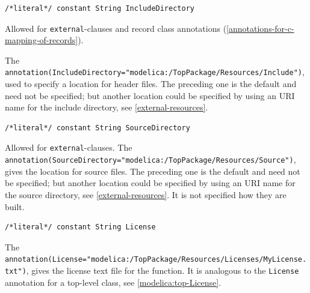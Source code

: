 \begin{annotationdefinition}[IncludeDirectory]
\begin{synopsis}\begin{lstlisting}
/*literal*/ constant String IncludeDirectory
\end{lstlisting}\end{synopsis}
\begin{semantics}
Allowed for \lstinline!external!-clauses and record class annotations (\cref{annotations-for-c-mapping-of-records}).

The {\lstinline!annotation(IncludeDirectory="modelica:/TopPackage/Resources/Include")!}, used to specify a location for header files.
The preceding one is the default and need not be specified; but another location could be specified by using an URI name for the include directory, see \cref{external-resources}.
\end{semantics}
\end{annotationdefinition}

\begin{annotationdefinition}[SourceDirectory]
\begin{synopsis}\begin{lstlisting}
/*literal*/ constant String SourceDirectory
\end{lstlisting}\end{synopsis}
\begin{semantics}
Allowed for {\lstinline!external!}-clauses.
The {\lstinline!annotation(SourceDirectory="modelica:/TopPackage/Resources/Source")!}, gives the location for source files.
The preceding one is the default and need not be specified; but another location could be specified by using an URI name for the source directory, see \cref{external-resources}.
It is not specified how they are built.
\end{semantics}
\end{annotationdefinition}

\begin{annotationdefinition*}[License]\label{modelica:extfun-License}
\begin{synopsis}\begin{lstlisting}
/*literal*/ constant String License
\end{lstlisting}\end{synopsis}
\begin{semantics}
The {\lstinline!annotation(License="modelica:/TopPackage/Resources/Licenses/MyLicense.txt")!}, gives the license text file for the function.
It is analogous to the \lstinline!License! annotation for a top-level class, see \cref{modelica:top-License}.
\end{semantics}
\end{annotationdefinition*}



